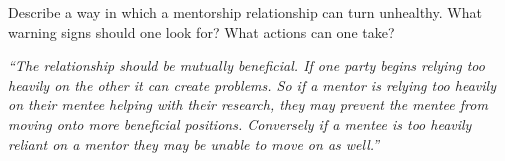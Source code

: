 \documentclass[portrait,11pt]{seminar}
\begin{document}
\es\bs

 Describe a way in which a mentorship relationship can turn unhealthy. What warning signs should one look for? What actions can one take?

{\it ``The relationship should be mutually beneficial. If one party begins relying too heavily on the other it can create problems. So if a mentor is relying too heavily on their mentee helping with their research, they may prevent the mentee from moving onto more beneficial positions. Conversely if a mentee is too heavily reliant on a mentor they may be unable to move on as well.''}







 \es 







\end{document}
